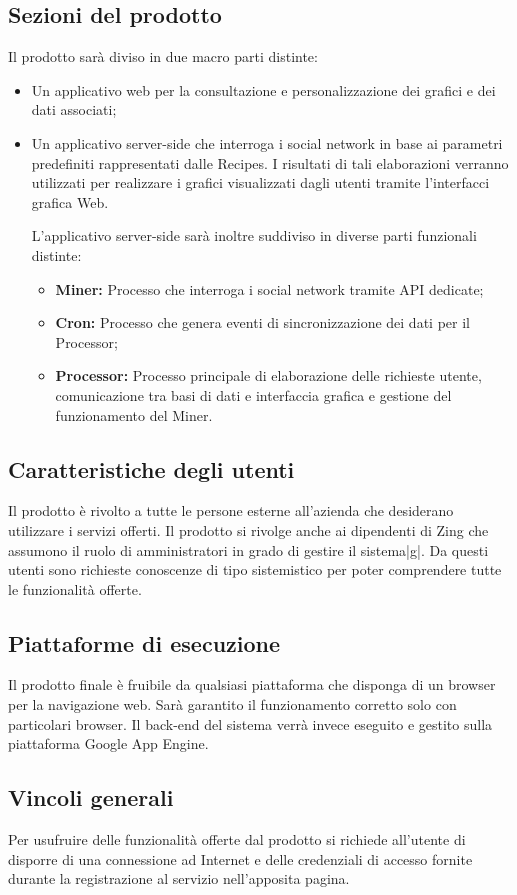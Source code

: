 \subsection{Sezioni del prodotto}
Il prodotto sarà diviso in due macro parti distinte:

\begin{itemize}
\item Un applicativo web per la consultazione e personalizzazione dei grafici e dei dati associati;
\item Un applicativo server-side che interroga i social network in base ai parametri predefiniti rappresentati dalle Recipes. I risultati di tali elaborazioni verranno utilizzati per realizzare i grafici visualizzati dagli utenti tramite l'interfacci grafica Web.

L'applicativo server-side sarà inoltre suddiviso in diverse parti funzionali distinte:
\begin{itemize}
\item \textbf{Miner:} Processo che interroga i social network tramite API dedicate;
\item \textbf{Cron:} Processo che genera eventi di sincronizzazione dei dati per il Processor;
\item \textbf{Processor:} Processo principale di elaborazione delle richieste utente, comunicazione tra basi di dati e interfaccia grafica e gestione del funzionamento del Miner.
\end{itemize}

\end{itemize}

\subsection{Caratteristiche degli utenti}
Il prodotto è rivolto a tutte le persone esterne all'azienda che desiderano utilizzare i servizi offerti. 
Il prodotto si rivolge anche ai dipendenti di Zing che assumono il ruolo di amministratori in grado di gestire il sistema|g|.
Da questi utenti sono richieste conoscenze di tipo sistemistico per poter comprendere tutte le funzionalità offerte.

\subsection{Piattaforme di esecuzione}
Il prodotto finale è fruibile da qualsiasi piattaforma che disponga di un browser per la navigazione web. Sarà garantito il funzionamento corretto solo con particolari browser.
Il back-end del sistema verrà invece eseguito e gestito sulla piattaforma Google App Engine.

\subsection{Vincoli generali}
Per usufruire delle funzionalità offerte dal prodotto si richiede all'utente di disporre
di una connessione ad Internet e delle credenziali di accesso fornite durante la registrazione al servizio nell'apposita pagina.
